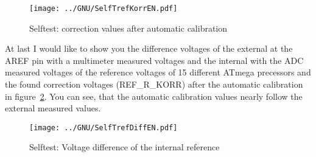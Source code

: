\begin{figure}[H]
  \centering
  \texttt{[image: ../GNU/SelfTrefKorrEN.pdf]}
  \caption{Selftest: correction values after automatic calibration}
  \label{fig:SelfTrefKorr}
\end{figure}

At last I would like to show you the difference voltages of the external at the
AREF pin with a multimeter measured voltages and the internal with the ADC
measured voltages of the reference voltages of 15 different ATmega precessors
and the found correction voltages (REF\_R\_KORR) after the automatic calibration in
figure~\ref{fig:SelfTrefDiff}.
You can see, that the automatic calibration values nearly follow the external measured values.

\begin{figure}[H]
  \centering
  \texttt{[image: ../GNU/SelfTrefDiffEN.pdf]}
  \caption{Selftest: Voltage difference of the internal reference}
  \label{fig:SelfTrefDiff}
\end{figure}

